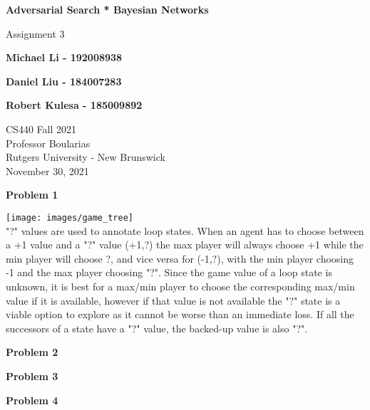 \documentclass[11pt]{article}
\begin{document}
    \begin{titlepage}
        \begin{center}
            \vspace{1cm}

            \Huge
            \textbf{Adversarial Search * Bayesian Networks}

            \vspace{0.5cm}
            \LARGE
            Assignment 3

            \vspace{1cm}

            \textbf{Michael Li - 192008938}

            \textbf{Daniel Liu - 184007283}

            \textbf{Robert Kulesa - 185009892}


            \vfill


            \vspace{0.8cm}

            \Large
            CS440 Fall 2021\\
            Professor Boularias\\
            Rutgers University - New Brunswick\\
            November 30, 2021

        \end{center}
    \end{titlepage}

    \begin{center}
        \Large
        \textbf{Problem 1}
    \end{center}
    \normalsize
    \texttt{[image: images/game\_tree]} \\
    "?" values are used to annotate loop states. When an agent has to choose between a +1 value and a "?" value (+1,?) the max player will always choose +1 while the min player will choose ?, and vice versa for (-1,?), with the min player choosing -1 and the max player choosing "?". Since the game value of a loop state is unknown, it is best for a max/min player to choose the corresponding max/min value if it is available, however if that value is not available the "?" state is a viable option to explore as it cannot be worse than an immediate loss. If all the successors of a state have a "?" value, the backed-up value is also "?".

    \begin{center}
        \Large
        \textbf{Problem 2}
    \end{center}
    \normalsize
    \begin{enumerate}

        
    \end{enumerate}

    \begin{center}
        \Large
        \textbf{Problem 3}
    \end{center}
    \normalsize

    \begin{center}
        \Large
        \textbf{Problem 4}
    \end{center}
    \normalsize


    
\end{document}
